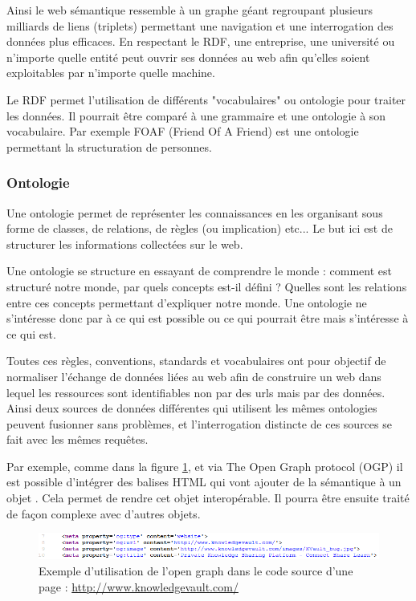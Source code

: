 Ainsi le web sémantique ressemble à un graphe géant regroupant plusieurs milliards de liens (triplets) permettant une navigation et une interrogation des données plus efficaces. En respectant le RDF, une entreprise, une université ou n'importe quelle entité peut ouvrir ses données au web afin qu'elles soient exploitables par n'importe quelle machine.

Le RDF permet l'utilisation de différents "vocabulaires" ou ontologie pour traiter les données. Il pourrait être comparé à une grammaire et une ontologie à son vocabulaire. Par exemple FOAF (Friend Of A Friend) est une ontologie permettant la structuration de personnes. \cite{foaf}

\subsubsection{Ontologie}

Une ontologie permet de représenter les connaissances en les organisant sous forme de classes, de relations, de règles (ou implication) etc... Le but ici est de structurer les informations collectées sur le web.

Une ontologie se structure en essayant de comprendre le monde : comment est structuré notre monde, par quels concepts est-il défini ? Quelles sont les relations entre ces concepts permettant d'expliquer notre monde. Une ontologie ne s'intéresse donc par à ce qui est possible ou ce qui pourrait être mais s'intéresse à ce qui est. \cite{shirky} \cite{schema}

Toutes ces règles, conventions, standards et vocabulaires ont pour objectif de normaliser l'échange de données liées au web afin de construire un web dans lequel les ressources sont identifiables non par des urls mais par des données. Ainsi deux sources de données différentes qui utilisent les mêmes ontologies peuvent fusionner sans problèmes, et l'interrogation distincte de ces sources se fait avec les mêmes requêtes.

Par exemple, comme dans la figure \ref{fig1}, et via The Open Graph protocol (OGP) il est possible d'intégrer des balises HTML qui vont ajouter de la sémantique à un objet \cite{ogp}. Cela permet de rendre cet objet interopérable. Il pourra être ensuite traité de façon complexe avec d'autres objets.

\begin{figure}[ht]
\centering
\includegraphics[width=\textwidth, draft=false]{imgs/og_example.PNG}
\caption{Exemple d'utilisation de l'open graph dans le code source d'une page : \url{http://www.knowledgevault.com/}}
\label{fig1}
\end{figure}

